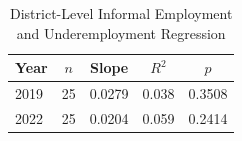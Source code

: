 \begin{table}[ht]
\caption{District-Level Informal Employment and Underemployment Regression}
\label{tab:district_regression}
\footnotesize
\begin{tabular}{lcccc}
\toprule
\textbf{Year} & \textbf{$n$} & \textbf{Slope} & \textbf{$R^2$} & \textbf{$p$}\\
\midrule
2019 & 25 & 0.0279 & 0.038 & 0.3508\\
2022 & 25 & 0.0204 & 0.059 & 0.2414\\
\bottomrule
\end{tabular}
\end{table}
